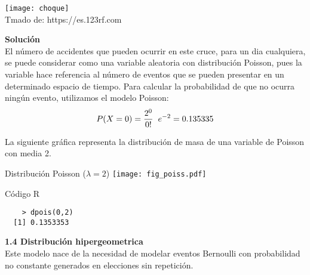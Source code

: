 \documentclass[base=hide,12pt]{elegantbook}
\begin{document}
\begin{center}
	\texttt{[image: choque]}\\
	Tmado de: https://es.123rf.com
\end{center}
\vspace{.5cm} 
\textcolor{col3}{\bf \large Solución }\\
El número de accidentes que pueden ocurrir en este cruce, para un dia cualquiera, se puede considerar como una variable aleatoria con distribución Poisson, pues la variable hace referencia al número de eventos que se pueden presentar en un determinado espacio de tiempo. 
Para calcular la probabilidad de que no ocurra ningún evento, utilizamos el modelo Poisson:
$$P(X = 0) = \dfrac{2^{0}}{0!} \hspace{.2cm} e^{-2}=0.135335$$

La siguiente gráfica representa la distribución de masa de una variable de Poisson con media 2.
\\
\vspace{1cm}
\begin{center}
	Distribución Poisson ($\lambda=2$)
	\texttt{[image: fig\_poiss.pdf]}
\end{center} 

\begin{Box3}{Código R }
	\begin{verbatim}
	> dpois(0,2)
  [1] 0.1353353
	\end{verbatim}

\end{Box3}
\vspace{1cm}
\textcolor{col4}{\LARGE  \bf 1.4 Distribución hipergeometrica }\\

Este modelo nace de la necesidad de modelar eventos Bernoulli con probabilidad no constante generados en elecciones sin repetición. 
\end{document}

